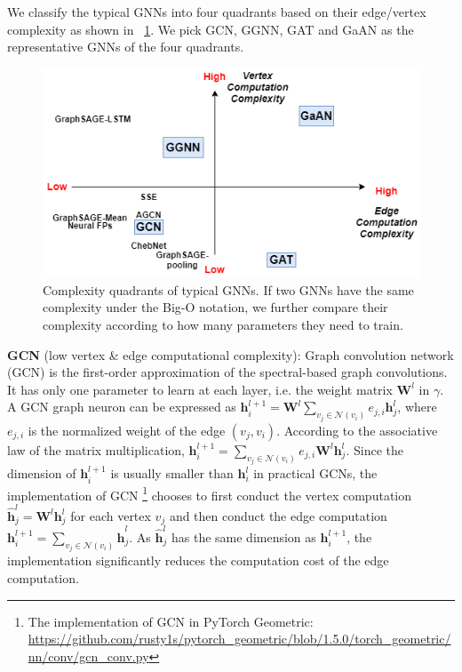 We classify the typical GNNs into four quadrants based on their edge/vertex complexity as shown in \figurename~\ref{fig:gnn_complexity_quadrant}. We pick GCN, GGNN, GAT and GaAN as the representative GNNs of the four quadrants.

\begin{figure}
	\centering
	\includegraphics[width=0.7\columnwidth]{figs/illustration/GNN_complexity_quadrant.png}
	\caption{Complexity quadrants of typical GNNs. If two GNNs have the same complexity under the Big-O notation, we further compare their complexity according to how many parameters they need to train.}
	\label{fig:gnn_complexity_quadrant}
\end{figure}

\textbf{GCN} \cite{kipf2017_gcn} (low vertex \& edge computational complexity): Graph convolution network (GCN) is the first-order approximation of the spectral-based graph convolutions.
It has only one parameter to learn at each layer, i.e. the weight matrix $\boldsymbol{W}^l$ in $\gamma$.
A GCN graph neuron can be expressed as $\boldsymbol{h}^{l+1}_i = \boldsymbol{W}^l\sum_{v_j \in \mathcal{N}(v_i)}{e_{j,i}\boldsymbol{h}^l_j}$, where $e_{j,i}$ is the normalized weight of the edge $(v_j, v_i)$.
According to the associative law of the matrix multiplication, $\boldsymbol{h}^{l+1}_i = \sum_{v_j \in \mathcal{N}(v_i)}{e_{j,i}\boldsymbol{W}^l\boldsymbol{h}^l_j}$.
Since the dimension of $\boldsymbol{h}^{l+1}_i$ is usually smaller than $\boldsymbol{h}^l_i$ in practical GCNs, the implementation of GCN \footnote{The implementation of GCN in PyTorch Geometric: \url{ https://github.com/rusty1s/pytorch_geometric/blob/1.5.0/torch_geometric/nn/conv/gcn_conv.py}} chooses to first conduct the vertex computation $\hat{\boldsymbol{h}}^l_j = \boldsymbol{W}^l\boldsymbol{h}^l_j$ for each vertex $v_j$ and then conduct the edge computation $\boldsymbol{h}^{l+1}_i=\sum_{v_j\in\mathcal{N}(v_i)}{\hat{\boldsymbol{h}}^l_j}$.
As $\hat{\boldsymbol{h}}^l_j$ has the same dimension as $\boldsymbol{h}^{l+1}_i$, the implementation significantly reduces the  computation cost of the edge computation.